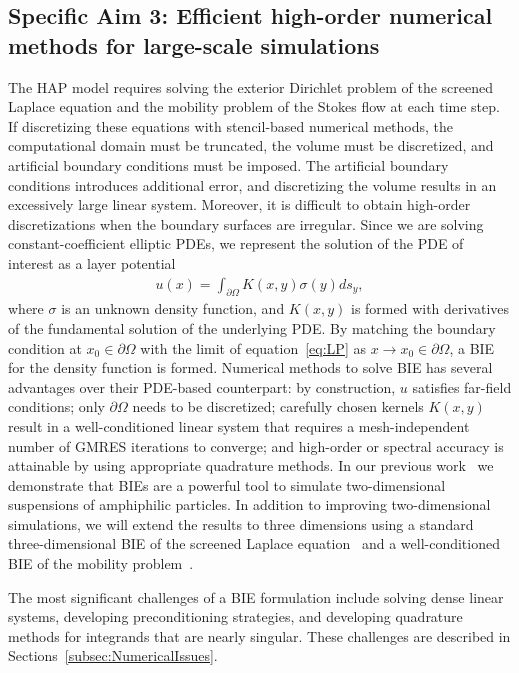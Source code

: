 \newpage

\subsection{Specific Aim 3: Efficient high-order numerical methods for
large-scale simulations}
\label{subsec:specific_aim_3}
The HAP model requires solving the exterior Dirichlet problem of the
screened Laplace equation and the mobility problem of the Stokes flow at
each time step. If discretizing these equations with stencil-based
numerical methods, the computational domain must be truncated, the
volume must be discretized, and artificial boundary conditions must be
imposed. The artificial boundary conditions introduces additional error,
and discretizing the volume results in an excessively large linear
system. Moreover, it is difficult to obtain high-order discretizations
when the boundary surfaces are irregular. Since we are solving
constant-coefficient elliptic PDEs, we represent the solution of the
PDE of interest as a layer potential 
\begin{align}
  \label{eq:LP}
  u(x) = \int_{\partial\Omega} K(x,y) \sigma(y) ds_y,
\end{align}
where $\sigma$ is an unknown density function, and $K(x,y)$ is formed
with derivatives of the fundamental solution of the underlying PDE.  By
matching the boundary condition at $x_0 \in \partial\Omega$ with the
limit of equation~\eqref{eq:LP} as $x\rightarrow x_0 \in
\partial\Omega$, a BIE for the density function is formed.
Numerical methods to solve BIE has several advantages over their
PDE-based counterpart: by construction, $u$ satisfies far-field
conditions; only $\partial\Omega$ needs to be discretized; carefully
chosen kernels $K(x,y)$ result in a well-conditioned linear system that
requires a mesh-independent number of GMRES iterations to converge; and
high-order or spectral accuracy is attainable by using appropriate
quadrature methods. In our previous work~\cite{Fu2018_SIAM} we
demonstrate that BIEs are a powerful tool to simulate two-dimensional
suspensions of amphiphilic particles. In addition to improving
two-dimensional simulations, we will extend the results to three
dimensions using a standard three-dimensional BIE of the screened
Laplace equation~\cite{ying_2006} and a well-conditioned BIE of the
mobility problem~\cite{manasthesis}.

The most significant challenges of a BIE formulation include solving
dense linear systems, developing preconditioning strategies, and
developing quadrature methods for integrands that are nearly singular.
These challenges are described in Sections~\ref{subsec:NumericalIssues}.


